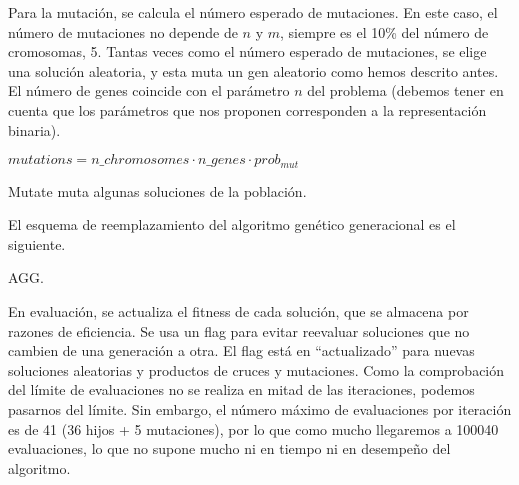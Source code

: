 \documentclass{article}
\begin{document}
Para la mutación, se calcula el número esperado de mutaciones. En este caso, el número de mutaciones no depende de $n$ y $m$, siempre
es el 10\% del número de cromosomas, 5. Tantas veces como el número esperado de mutaciones, se elige una solución aleatoria, y esta
muta un gen aleatorio como hemos descrito antes. El número de genes coincide con el parámetro $n$ del problema (debemos tener en cuenta
que los parámetros que nos proponen corresponden a la representación binaria).

\begin{algorithm}[H]
	\DontPrintSemicolon %
	$mutations=n\_chromosomes\cdot n\_genes\cdot prob_{mut}$ 
	\caption{{\sc Mutate} muta algunas soluciones de la población.}
	\label{alg:mutate-generational}
\end{algorithm}

El esquema de reemplazamiento del algoritmo genético generacional es el siguiente.

\begin{algorithm}[H]
	\DontPrintSemicolon %
	\caption{{\sc AGG}.}
	\label{alg:generational}
\end{algorithm}

En evaluación, se actualiza el fitness de cada solución, que se almacena por razones de eficiencia. Se usa un flag para evitar reevaluar soluciones
que no cambien de una generación a otra. El flag está en ``actualizado'' para nuevas soluciones aleatorias y productos de cruces y
mutaciones. Como la comprobación del límite de evaluaciones no se realiza en mitad de las iteraciones, podemos pasarnos del límite.
Sin embargo, el número máximo de evaluaciones por iteración es de 41 (36 hijos + 5 mutaciones), por lo que como mucho llegaremos a
100040 evaluaciones, lo que no supone mucho ni en tiempo ni en desempeño del algoritmo.
\end{document}
